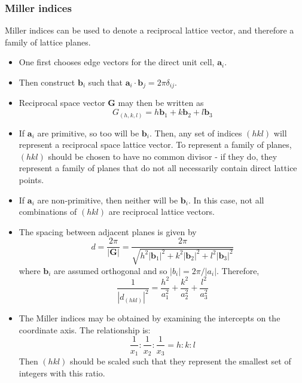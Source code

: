 \documentclass[10pt]{article}
\begin{document}
\subsubsection{Miller indices}
Miller indices can be used to denote a reciprocal lattice vector, and therefore a family of lattice planes.
\begin{itemize}
  \item One first chooses edge vectors for the direct unit cell, $\textbf{a}_{i}$.
  \item Then construct $\textbf{b}_{i}$ such that $\textbf{a}_{i}\cdot \textbf{b}_{j} = 2\pi\delta_{ij}$.
  \item Reciprocal space vector $\textbf{G}$ may then be written as
  $$G_{(h,k,l)} = h\textbf{b}_{1} + k\textbf{b}_{2} + l\textbf{b}_{3}$$
  \item If $\textbf{a}_{i}$ are primitive, so too will be $\textbf{b}_{i}$. Then, any set of indices $(hkl)$ will represent a reciprocal
  space lattice vector. To represent a family of planes, $(hkl)$ should be chosen to have no common divisor - if they do, they represent a family
  of planes that do not all necessarily contain direct lattice points.
  \item If $\textbf{a}_{i}$ are non-primitive, then neither will be $\textbf{b}_{i}$. In this case, not all combinations of $(hkl)$ are reciprocal lattice vectors.
  \item The spacing between adjacent planes is given by
  $$ d = \frac{2\pi}{|\textbf{G}|} = \frac{2\pi}{\sqrt{h^{2}|\textbf{b}_{1}|^{2} + k^{2}|\textbf{b}_{2}|^{2} + l^{2}|\textbf{b}_{3}|^{2}}}$$
  where $\textbf{b}_{i}$ are assumed orthogonal and so $|b_{i}| = 2\pi/|a_{i}|$. Therefore,
  $$\frac{1}{|d_{(hkl)}|^{2}} = \frac{h^2}{a_{1}^2} + \frac{k^2}{a_{2}^2} + \frac{l^2}{a_{3}^2}$$
  \item The Miller indices may be obtained by examining the intercepts on the coordinate axis. The relationship is:
  $$
  \frac{1}{x_{1}}:\frac{1}{x_{2}}:\frac{1}{x_{3}} = h:k:l
  $$
  Then $(hkl)$ should be scaled such that they represent the smallest set of integers with this ratio.


\end{itemize}
\end{document}
